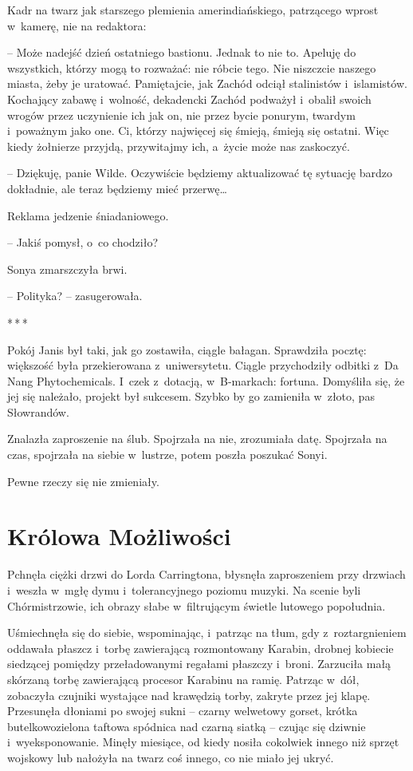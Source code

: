 \documentclass[oneside,polish,11pt,sfheadings]{mwbk}
\newcommand{\threeast}{\bigskip\par\centerline{*\,*\,*}\medskip\par}%
\begin{document}
Kadr na twarz jak starszego plemienia amerindiańskiego, patrzącego
wprost w~kamerę, nie na redaktora: 

-- Może nadejść dzień ostatniego
bastionu. Jednak to nie to. Apeluję do wszystkich, którzy mogą to
rozważać: nie róbcie tego. Nie niszczcie naszego miasta, żeby je
uratować. Pamiętajcie, jak Zachód odciął stalinistów i~islamistów.
Kochający zabawę i~wolność, dekadencki Zachód podważył i~obalił swoich
wrogów przez uczynienie ich jak on, nie przez bycie ponurym, twardym i~poważnym jako one. Ci, którzy najwięcej się śmieją, śmieją się ostatni.
Więc kiedy żołnierze przyjdą, przywitajmy ich, a~życie może nas
zaskoczyć.

-- Dziękuję, panie Wilde. Oczywiście będziemy aktualizować tę sytuację
bardzo dokładnie, ale teraz będziemy mieć przerwę\ldots

Reklama jedzenie śniadaniowego.

-- Jakiś pomysł, o~co chodziło?

Sonya zmarszczyła brwi. 

-- Polityka? -- zasugerowała.
  \threeast 

Pokój Janis był taki, jak go zostawiła, ciągle bałagan. Sprawdziła
pocztę: większość była przekierowana z~uniwersytetu. Ciągle przychodziły
odbitki z~Da Nang Phytochemicals. I~czek z~dotacją, w~B-markach:
fortuna. Domyśliła się, że jej się należało, projekt był sukcesem.
Szybko by go zamieniła w~złoto, pas Słowrandów.

Znalazła zaproszenie na ślub. Spojrzała na nie, zrozumiała datę.
Spojrzała na czas, spojrzała na siebie w~lustrze, potem poszła poszukać
Sonyi.

Pewne rzeczy się nie zmieniały.

\chapter{Królowa Możliwości}

Pchnęła ciężki drzwi do Lorda Carringtona, błysnęła zaproszeniem przy
drzwiach i~weszła w~mgłę dymu i~tolerancyjnego poziomu muzyki. Na scenie
byli Chórmistrzowie, ich obrazy słabe w~filtrującym świetle lutowego
popołudnia.

Uśmiechnęła się do siebie, wspominając, i~patrząc na tłum, gdy z~roztargnieniem oddawała płaszcz i~torbę zawierającą rozmontowany
Karabin, drobnej kobiecie siedzącej pomiędzy przeładowanymi regałami
płaszczy i~broni. Zarzuciła małą skórzaną torbę zawierającą procesor
Karabinu na ramię. Patrząc w~dół, zobaczyła czujniki wystające nad
krawędzią torby, zakryte przez jej klapę. Przesunęła dłoniami po swojej
sukni -- czarny welwetowy gorset, krótka butelkowozielona taftowa
spódnica nad czarną siatką -- czując się dziwnie i~wyeksponowanie. Minęły
miesiące, od kiedy nosiła cokolwiek innego niż sprzęt wojskowy lub
nałożyła na twarz coś innego, co nie miało jej ukryć.
\end{document}
